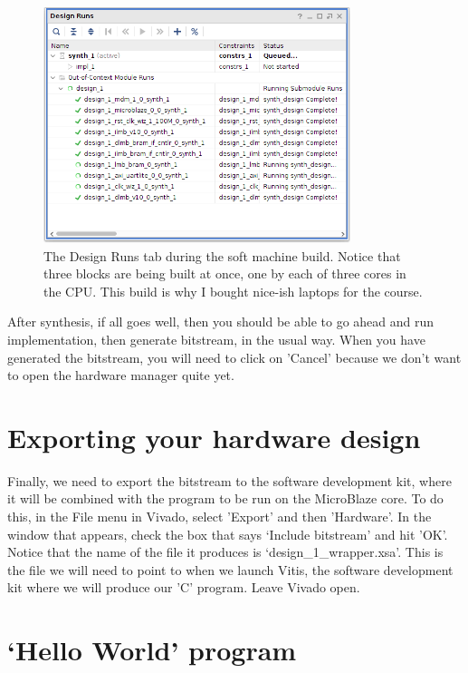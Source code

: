 \documentclass[../physical_computing.tex]{subfiles}
\begin{document}
\begin{figure}[h!]
    \centering
    \includegraphics[width=0.8\textwidth]{figures/designruns.png}
    \caption{The Design Runs tab during the soft machine build. Notice that three blocks are being built at once, one by each
    of three cores in the CPU. This build is why I bought nice-ish laptops for the course.}
    \label{fig:designruns}
\end{figure}

After synthesis, if all goes well, then you should be able to go ahead and run implementation, then generate bitstream, in the usual
way. When you have generated the bitstream, you will need to click on 'Cancel' because we don't want to open the hardware manager
quite yet.

\section{Exporting your hardware design}
\label{sec:export}

Finally, we need to export the bitstream to the software development kit, where it will be combined with the program to be run on the MicroBlaze core. To do this, in the File menu in Vivado, select 'Export' and then 'Hardware'. In the window that appears, check the box that says `Include bitstream' and hit 'OK'. Notice that the name of the file it produces is
`design\_1\_wrapper.xsa'. This is the file we will need to point to when we launch Vitis, the software development kit where we will produce our 'C' program. Leave Vivado open.

\section{`Hello World' program}
\label{sec:helloworld}
\end{document}
